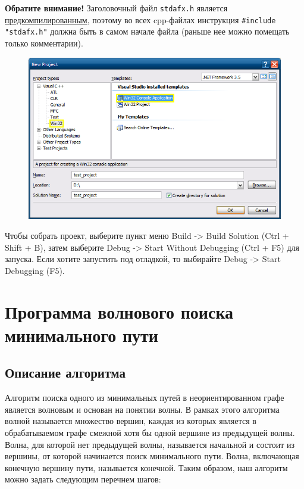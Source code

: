 \textbf{Обратите внимание!} Заголовочный файл \verb|stdafx.h| является
\href{http://ru.wikipedia.org/wiki/%D0%9F%D1%80%D0%B5%D0%B4%D0%B2%D0%B0%D1%80%D0%B8%D1%82%D0%B5%D0%BB%D1%8C%D0%BD%D0%BE_%D0%BE%D1%82%D0%BA%D0%BE%D0%BC%D0%BF%D0%B8%D0%BB%D0%B8%D1%80%D0%BE%D0%B2%D0%B0%D0%BD%D0%BD%D1%8B%D0%B5_%D0%B7%D0%B0%D0%B3%D0%BE%D0%BB%D0%BE%D0%B2%D0%BA%D0%B8}{предкомпилированным}, поэтому во всех cpp-файлах инструкция \lstinline{#include "stdafx.h"} должна быть в самом начале файла (раньше нее можно помещать только комментарии).
 
  \begin{figure}[h!]
    \centering
    \includegraphics[scale=0.6]{images/1/Select_project_type}
  \end{figure}

Чтобы собрать проект, выберите пункт меню Build -> Build Solution
(Ctrl + Shift + B), затем выберите Debug -> Start Without Debugging
(Ctrl + F5) для запуска. Если хотите запустить под отладкой, то
выбирайте Debug -> Start Debugging (F5).

\section{Программа волнового поиска минимального пути}

\subsection{Описание алгоритма}

Алгоритм поиска одного из минимальных путей в неориентированном графе
является волновым и основан на понятии волны. В рамках этого алгоритма
волной называется множество вершин, каждая из которых является в
обрабатываемом графе смежной хотя бы одной вершине из предыдущей
волны. Волна, для которой нет предыдущей волны, называется начальной и
состоит из вершины, от которой начинается поиск минимального
пути. Волна, включающая конечную вершину пути, называется
конечной. Таким образом, наш алгоритм можно задать следующим перечнем
шагов:

